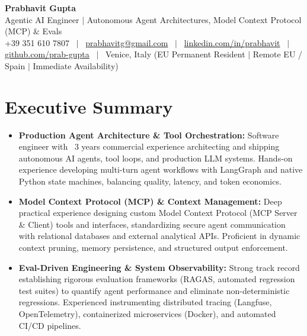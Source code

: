 \documentclass[a4paper,10pt]{article}
\begin{document}
\begin{minipage}[c]{0.80\textwidth}
  {\Huge\bfseries Prabhavit Gupta}\\[3pt]
  {\color{accent}\large Agentic AI Engineer $\vert$ Autonomous Agent Architectures, Model Context Protocol (MCP) $\&$ Evals}\\[6pt]
  {\footnotesize +39 351 610 7807 ~$\vert$~
  \href{mailto:prabhavitg@gmail.com}{prabhavitg@gmail.com} ~$\vert$~
  \href{https://www.linkedin.com/in/prabhavit/}{linkedin.com/in/prabhavit} ~$\vert$~
  \href{https://github.com/prab-gupta}{github.com/prab-gupta} ~$\vert$~
  Venice, Italy (EU Permanent Resident $\vert$ Remote EU / Spain $\vert$ Immediate Availability)}
\end{minipage}\hfill

\vspace{6pt}

\section{Executive Summary}
\begin{itemize}
  \item \textbf{Production Agent Architecture \& Tool Orchestration:} Software engineer with ~3 years commercial experience architecting and shipping autonomous AI agents, tool loops, and production LLM systems. Hands-on experience developing multi-turn agent workflows with LangGraph and native Python state machines, balancing quality, latency, and token economics.
  \item \textbf{Model Context Protocol (MCP) \& Context Management:} Deep practical experience designing custom Model Context Protocol (MCP Server \& Client) tools and interfaces, standardizing secure agent communication with relational databases and external analytical APIs. Proficient in dynamic context pruning, memory persistence, and structured output enforcement.
  \item \textbf{Eval-Driven Engineering \& System Observability:} Strong track record establishing rigorous evaluation frameworks (RAGAS, automated regression test suites) to quantify agent performance and eliminate non-deterministic regressions. Experienced instrumenting distributed tracing (Langfuse, OpenTelemetry), containerized microservices (Docker), and automated CI/CD pipelines.
\end{itemize}

\end{document}
